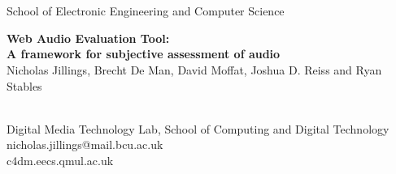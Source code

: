 \begin{center}
\colorbox{qmuldarkblue}
{
 \color{white}

 \parbox{1.0\textwidth}
 {
  \parbox{0.2\textwidth}
  {
   \begin{center}
   \\[1ex]
   \\[1ex]
   \textrm
   {
    \footnotesize
    {\fontsize{1cm}{1cm}\selectfont
    School of Electronic Engineering and Computer Science
    }
   }
   \end{center}
  }
  \parbox{0.58\textwidth}
  {
   \vspace{1cm}
   \begin{center}
    {\veryHuge \bf Web Audio Evaluation Tool:\\[0.5ex]
    A framework for subjective assessment of audio}\\[1ex]
    {\Large Nicholas Jillings, Brecht De Man, David Moffat, Joshua D. Reiss and Ryan Stables}
   \end{center}
   \vspace{1cm}
  }
  \parbox{0.2\textwidth}
  {
   \begin{center}
   \\[1ex]
   \textrm
   {
     \footnotesize
    {\fontsize{1cm}{1cm}\selectfont
    Digital Media Technology Lab, School of Computing and Digital Technology
    }
     {\fontsize{1cm}{1.2cm}\selectfont
   nicholas.jillings@mail.bcu.ac.uk\\
    c4dm.eecs.qmul.ac.uk\\
    }
   }
   \end{center}
  }
 }
}
\end{center}
